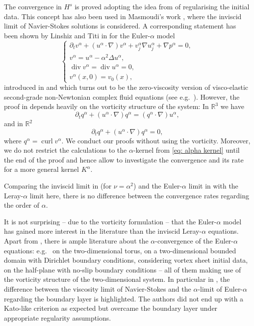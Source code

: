 \documentclass{amsart}
\begin{document}
The convergence in $H^s$ is proved adopting the idea from \cite{DaBeiraoVeiga.1994b, DaBeiraoVeiga.1994,MR1199199} of regularising the initial data. This concept has also been used in Masmoudi's work \cite{Masmoudi.2007}, where the inviscid limit of Navier-Stokes solutions is considered. A corresponding statement has been shown by Linshiz and Titi in \cite{Linshiz.2010} for the Euler-$\alpha$ model
\begin{equation}
\label{eq: euler-alpha}
\begin{cases}
    \partial_t v^{\alpha} + (u^{\alpha}\cdot\nabla) v^{\alpha} + v^{\alpha}_j \nabla u^{\alpha}_j + \nabla p^{\alpha}= 0,\\
    v^{\alpha}=u^{\alpha}-\alpha^2 \Delta u^{\alpha},\\
    \operatorname{div}v^{\alpha}= \operatorname{div}u^{\alpha}=0,\\
     v^{\alpha}(x,0)=v_0(x),
\end{cases}
\end{equation}
introduced in \cite{Holm.1998, Holm.1998b} and which turns out to be the zero-viscosity version of visco-elastic second-grade non-Newtonian complex fluid equations (see e.g.\ \cite{Dunn.1974}). However, the proof in \cite{Linshiz.2010} depends heavily on the vorticity structure of the system: In $\mathbb{R}^3$ we have
$$ \partial_t q^{\alpha} + (u^{\alpha}\cdot \nabla) q^{\alpha}=(q^{\alpha}\cdot \nabla) u^{\alpha}, $$
and in $\mathbb{R}^2$
$$ \partial_t q^{\alpha} + (u^{\alpha}\cdot \nabla) q^{\alpha}=0, $$
where $q^{\alpha}=\operatorname{curl} v^{\alpha}$. 
We conduct our proofs without using the vorticity. Moreover, we do not restrict the calculations to the $\alpha$-kernel from \eqref{eq: alpha kernel} until the end of the proof and hence allow to investigate the convergence and its rate for a more general kernel $K^{\alpha}$. 

Comparing the inviscid limit in \cite{Masmoudi.2007} (for $\nu=\alpha^2$) and the Euler-$\alpha$ limit in \cite{Linshiz.2010} with the Leray-$\alpha$ limit here, there is no difference between the convergence rates regarding the order of $\alpha$.

It is not surprising -- due to the vorticity formulation -- that the Euler-$\alpha$ model has gained more interest in the literature than the inviscid Leray-$\alpha$ equations. Apart from \cite{Linshiz.2010}, there is ample literature about the $\alpha$-convergence of the Euler-$\alpha$ equations: e.g.\ \cite{Abbate.2024} on the two-dimensional torus, \cite{Busuioc.2017,LopesFilho.2015} on a two-dimensional bounded domain with Dirichlet boundary conditions, \cite{Bardos.2010} considering vortex sheet initial data, \cite{Busuioc.2020} on the half-plane with no-slip boundary conditions  -- all of them making use of the vorticity structure of the two-dimensional system. In particular in \cite{LopesFilho.2015}, the difference between the viscosity limit of Navier-Stokes and the $\alpha$-limit of Euler-$\alpha$ regarding the boundary layer is highlighted. The authors did not end up with a Kato-like criterion as expected but overcame the boundary layer under appropriate regularity assumptions. 
\end{document}
